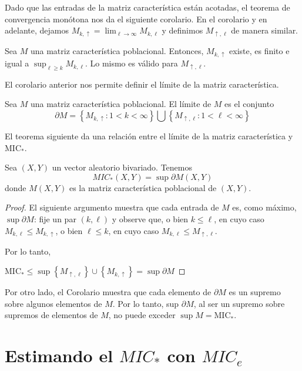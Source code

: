 	Dado que las entradas de la matriz caracter\'istica est\'an acotadas, el teorema de convergencia mon\'otona nos da el siguiente corolario. En el corolario y en adelante, dejamos $M_{k, \uparrow}=\lim _{\ell \rightarrow \infty} M_{k, \ell}$ y definimos $M_{\uparrow, \ell}$ de manera similar.
	\begin{cor}
		Sea $M$ una matriz caracter\'istica poblacional. Entonces, $M_{k, \uparrow}$ existe, es finito e igual a $\sup _{\ell \geq k} M_{k, \ell}$. Lo mismo es v\'alido para $M_{\uparrow, \ell}$.
	\end{cor}

	El corolario anterior nos permite definir el l\'imite de la matriz caracter\'istica.

	\begin{defn}
		Sea $M$ una matriz caracter\'istica poblacional. El l\'imite de $M$ es el conjunto
		$$
		\partial M=\left\{M_{k, \uparrow}: 1<k<\infty\right\} \bigcup\left\{M_{\uparrow, \ell}: 1<\ell<\infty\right\}
		$$
	\end{defn}
	
	El teorema siguiente da una relaci\'on entre el l\'imite de la matriz caracter\'istica y $\mathrm{MIC}_*$.
	
	
	\begin{thm}
	Sea $(X, Y)$ un vector aleatorio bivariado. Tenemos
	$$
	M I C_*(X, Y)=\sup \partial M(X, Y)
	$$
	donde $M(X, Y)$ es la matriz caracter\'istica poblacional de $(X, Y)$.
	\end{thm}


	\begin{proof}
		El siguiente argumento muestra que cada entrada de $M$ es, como m\'aximo, $\sup \partial M$: fije un par $(k, \ell)$ y observe que, o bien $k \leq \ell$, en cuyo caso $M_{k, \ell} \leq M_{k, \uparrow}$, o bien $\ell \leq k$, en cuyo caso $M_{k, \ell} \leq M_{\uparrow, \ell}$. 
		
		Por lo tanto, 
		
		$\mathrm{MIC}_* \leq \sup \left\{M_{\uparrow, \ell}\right\} \cup\left\{M_{k, \uparrow}\right\}=\sup \partial M$
	\end{proof}
	
	Por otro lado, el Corolario muestra que cada elemento de $\partial M$ es un supremo sobre algunos elementos de $M$. Por lo tanto, sup $\partial M$, al ser un supremo sobre supremos de elementos de $M$, no puede exceder $\sup M=\mathrm{MIC}_*$.


	\section[Estimando el MIC_star con MIC_e]{Estimando el $MIC_*$ con $MIC_e$}

